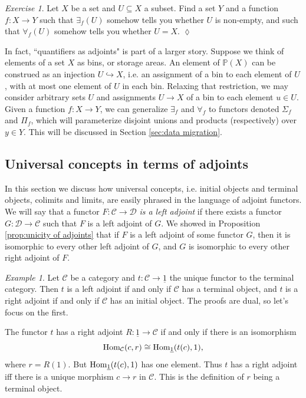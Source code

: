 \documentclass{book}
\def\tn{\textnormal}
\def\mc{\mathcal}
\def\PP{{\mathbb P}}
\def\Hom{\tn{Hom}}
\def\to{\rightarrow}
\def\taking{\colon}
\def\inj{\hookrightarrow}
\def\ss{\subseteq}
\def\iso{\cong}
\def\ul{\underline}
\def\mcC{\mc{C}}
\def\mcD{\mc{D}}
\theoremstyle{remark}
\newtheorem{example}[subsubsection]{Example}
\newtheorem{exc}[subsubsection]{Exercise}
\newenvironment{exercise}{\begin{exc}}{\hspace*{\fill}$\lozenge$\end{exc}}
\theoremstyle{definition}
\begin{document}
\begin{exercise}
Let $X$ be a set and $U\ss X$ a subset. Find a set $Y$ and a function $f\taking X\to Y$ such that $\exists_f(U)$ somehow tells you whether $U$ is non-empty, and such that $\forall_f(U)$ somehow tells you whether $U=X$.
\end{exercise}

In fact, ``quantifiers as adjoints" is part of a larger story. Suppose we think of elements of a set $X$ as bins, or storage areas. An element of $\PP(X)$ can be construed as an injection $U\inj X$, i.e. an assignment of a bin to each element of $U$, with at most one element of $U$ in each bin. Relaxing that restriction, we may consider arbitrary sets $U$ and assignments $U\to X$ of a bin to each element $u\in U$. Given a function $f\taking X\to Y$, we can generalize $\exists_f$ and $\forall_f$ to functors denoted $\Sigma_f$ and $\Pi_f$, which will parameterize disjoint unions and products (respectively) over $y\in Y$. This will be discussed in Section \ref{sec:data migration}.


\subsection{Universal concepts in terms of adjoints}\label{sec:universal concepts}

In this section we discuss how universal concepts, i.e. initial objects and terminal objects, colimits and limits, are easily phrased in the language of adjoint functors. We will say that a functor $F\taking\mcC\to\mcD$ {\em is a left adjoint} if there exists a functor $G\taking\mcD\to\mcC$ such that $F$ is a left adjoint of $G$. We showed in Proposition \ref{prop:unicity of adjoints} that if $F$ is a left adjoint of some functor $G$, then it is isomorphic to every other left adjoint of $G$, and $G$ is isomorphic to every other right adjoint of $F$.

\begin{example}

Let $\mcC$ be a category and $t\taking\mcC\to\ul{1}$ the unique functor to the terminal category. Then $t$ is a left adjoint if and only if $\mcC$ has a terminal object, and $t$ is a right adjoint if and only if $\mcC$ has an initial object. The proofs are dual, so let's focus on the first.

The functor $t$ has a right adjoint $R\taking\ul{1}\to\mcC$ if and only if there is an isomorphism $$\Hom_\mcC(c,r)\iso\Hom_{\ul{1}}(t(c),1),$$ where $r=R(1)$. But $\Hom_{\ul{1}}(t(c),1)$ has one element. Thus $t$ has a right adjoint iff there is a unique morphism $c\to r$ in $\mcC$. This is the definition of $r$ being a terminal object.

\end{example}
\end{document}
